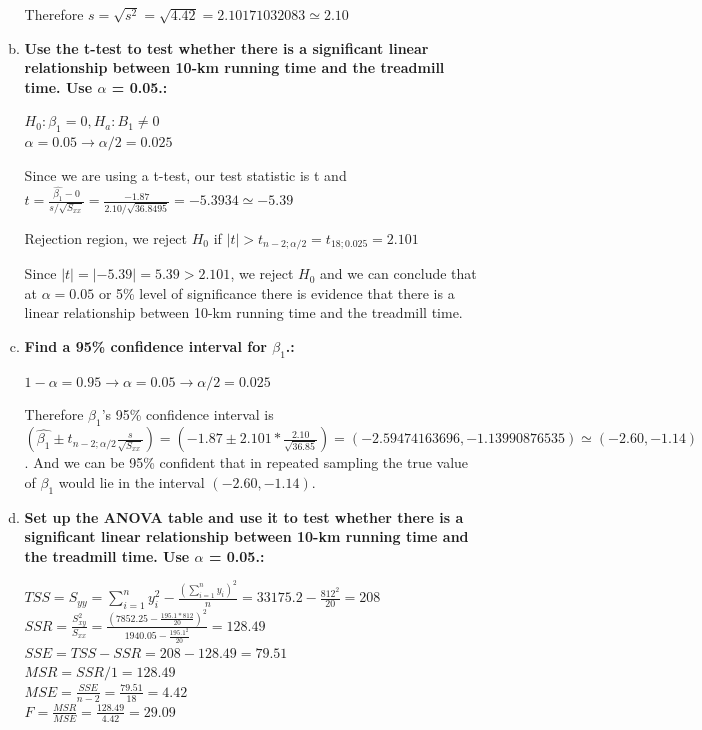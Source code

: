 \documentclass{article}
\begin{document}
\begin{enumerate}[1.]
\begin{enumerate}[(a)]
Therefore $s = \sqrt{s^2} = \sqrt{4.42} = 2.10171032083 \simeq 2.10$

  \item \textbf{Use the t-test to test whether there is a significant linear relationship between 10-km
running time and the treadmill time. Use $\alpha$ = 0.05.: }

$H_0: \beta_1 = 0, H_a: B_1 \neq 0$ \\
$\alpha = 0.05 \to \alpha/2 = 0.025$

Since we are using a t-test, our test statistic is t and $t= \frac{\hat{\beta_1} - 0}{s/\sqrt{S_{xx}}} = \frac{-1.87}{2.10/\sqrt{36.8495}} = -5.3934 \simeq -5.39$

Rejection region, we reject $H_0$ if $|t| > t_{n-2;\alpha/2} = t_{18;0.025} = 2.101$

Since $|t| = |-5.39| = 5.39 > 2.101$, we reject $H_0$ and we can conclude that at $\alpha = 0.05$ or 5\% level of significance there is evidence that there is a linear relationship between 10-km running time and the treadmill time.

  \item \textbf{ Find a 95\% confidence interval for $\beta_1$.: }

$1 - \alpha = 0.95 \to \alpha = 0.05 \to \alpha/2 = 0.025$

Therefore $\beta_1$'s 95\% confidence interval is \\ 
$(\hat{\beta_1} \pm t_{n-2;\alpha/2}\frac{s}{\sqrt{S_{xx}}}) = (-1.87 \pm 2.101 * \frac{2.10}{\sqrt{36.85}}) = (-2.59474163696, -1.13990876535) \simeq (-2.60, -1.14) $. And we can be 95\% confident that in repeated sampling the true value of $\beta_1$ would lie in the interval $(-2.60, -1.14)$.

  \item \textbf{ Set up the ANOVA table and use it to test whether there is a significant linear relationship between 10-km running time and the treadmill time. Use $\alpha$ = 0.05.: }

$TSS = S_{yy} = \sum_{i=1}^{n}{y_i^2} - \frac{ (\sum_{i=1}^{n}{y_i})^2 }{n} = 33175.2 - \frac{812^2}{20} = 208 $ \\
$SSR = \frac{S_{xy}^2}{S_{xx}} = \frac{ (7852.25 - \frac{195.1 * 812}{20})^2}{ 1940.05 - \frac{195.1^2}{20}} = 128.49 $ \\
$SSE = TSS - SSR = 208 - 128.49 = 79.51 $ \\ 
$MSR = SSR/1 = 128.49 $ \\ 
$MSE = \frac{SSE}{n-2} = \frac{79.51}{18} = 4.42$ \\
$F = \frac{MSR}{MSE} = \frac{128.49}{4.42} =  29.09 $ \\


\end{enumerate}
\end{enumerate}
\end{document}
